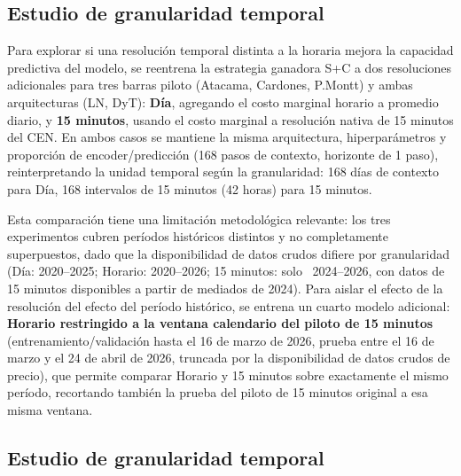 

\subsection{Estudio de granularidad temporal}

Para explorar si una resolución temporal distinta a la horaria mejora la capacidad predictiva del modelo, se reentrena la estrategia ganadora S+C a dos resoluciones adicionales para tres barras piloto (Atacama, Cardones, P.Montt) y ambas arquitecturas (LN, DyT): \textbf{Día}, agregando el costo marginal horario a promedio diario, y \textbf{15 minutos}, usando el costo marginal a resolución nativa de 15 minutos del CEN. En ambos casos se mantiene la misma arquitectura, hiperparámetros y proporción de encoder/predicción (168 pasos de contexto, horizonte de 1 paso), reinterpretando la unidad temporal según la granularidad: 168 días de contexto para Día, 168 intervalos de 15 minutos (42 horas) para 15 minutos.

Esta comparación tiene una limitación metodológica relevante: los tres experimentos cubren períodos históricos distintos y no completamente superpuestos, dado que la disponibilidad de datos crudos difiere por granularidad (Día: 2020--2025; Horario: 2020--2026; 15 minutos: solo ~2024--2026, con datos de 15 minutos disponibles a partir de mediados de 2024). Para aislar el efecto de la resolución del efecto del período histórico, se entrena un cuarto modelo adicional: \textbf{Horario restringido a la ventana calendario del piloto de 15 minutos} (entrenamiento/validación hasta el 16 de marzo de 2026, prueba entre el 16 de marzo y el 24 de abril de 2026, truncada por la disponibilidad de datos crudos de precio), que permite comparar Horario y 15 minutos sobre exactamente el mismo período, recortando también la prueba del piloto de 15 minutos original a esa misma ventana.


\subsection{Estudio de granularidad temporal}
\label{sec:granularidad}

